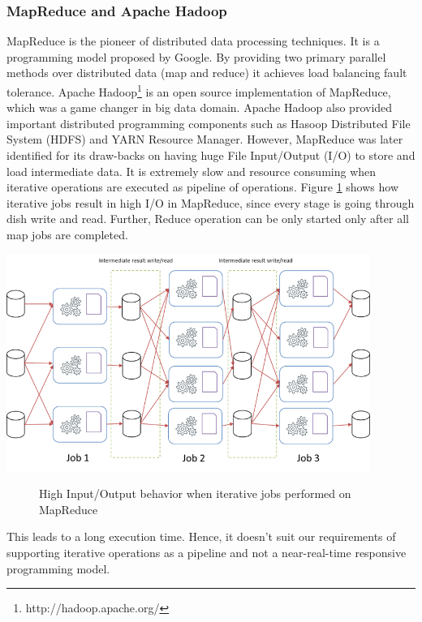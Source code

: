 \subsubsection{MapReduce and Apache Hadoop}
MapReduce is the pioneer of distributed data processing techniques. It is a programming model proposed by Google. By providing two primary parallel methods over distributed data (map and reduce) it achieves load balancing fault tolerance. Apache Hadoop\footnote{http://hadoop.apache.org/} is an open source implementation of MapReduce, which was a game changer in big data domain. Apache Hadoop also provided important distributed programming components such as  Hasoop Distributed File System (HDFS) and YARN Resource Manager. However, MapReduce was later identified for its draw-backs on having huge File Input/Output (I/O) to store and load intermediate data. It is extremely slow and resource consuming when iterative operations are executed as pipeline of operations. Figure \ref{fig:hadoop-high-io} shows how iterative jobs result in high I/O in MapReduce, since every stage is going through dish write and read. Further, Reduce operation can be only started only after all map jobs are completed.
 \begin{center}
	\includegraphics[width=32em]{./Figures/hadoop-high-io}
	\begin{figure}[htbp]
    \caption{High Input/Output behavior when iterative jobs performed on MapReduce}
    \label{fig:hadoop-high-io}
	\end{figure}
\end{center}
 This leads to a long execution time. Hence, it doesn't suit our requirements of supporting iterative operations as a pipeline and not a near-real-time responsive programming model. 

